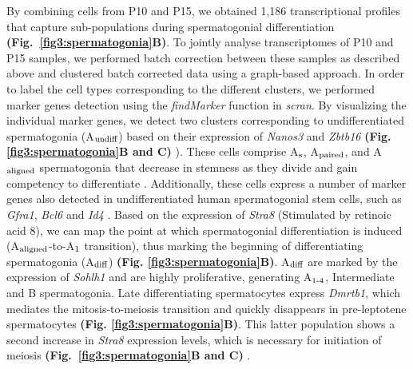 By combining cells from P10 and P15, we obtained 1,186 transcriptional profiles that capture sub-populations during spermatogonial differentiation \textbf{(Fig.~\ref{fig3:spermatogonia}B)}. To jointly analyse transcriptomes of P10 and P15 samples, we performed batch correction between these samples as described above and clustered batch corrected data using a graph-based approach. In order to label the cell types corresponding to the different clusters, we performed marker genes detection using the \emph{findMarker} function in \emph{scran}. By visualizing the individual marker genes, we detect two clusters corresponding to undifferentiated spermatogonia (A$_\textnormal{undiff}$) based on their expression of \textit{Nanos3} and \textit{Zbtb16} \textbf{(Fig. \ref{fig3:spermatogonia}B and C)} \citep{Buaas2004, Lolicato2008}). These cells comprise A$_\textnormal{s}$, A$_\textnormal{paired}$, and A$_\textnormal{aligned}$ spermatogonia that decrease in stemness as they divide and gain competency to differentiate \citep{Suzuki2012}. Additionally, these cells express a number of marker genes also detected in undifferentiated human spermatogonial stem cells, such as \textit{Gfra1}, \textit{Bcl6} and \textit{Id4} \citep{Guo2017}. Based on the expression of \textit{Stra8} (Stimulated by retinoic acid 8), we can map the point at which spermatogonial differentiation is induced (A$_\textnormal{aligned}$-to-A$_\textnormal{1}$ transition), thus marking the beginning of differentiating spermatogonia (A$_\textnormal{diff}$) \citep{Endo2015} \textbf{(Fig. \ref{fig3:spermatogonia}B)}. A$_\textnormal{diff}$ are marked by the expression of \textit{Sohlh1} \citep{Ballow2006} and are highly proliferative, generating A$_\textnormal{1-4}$, Intermediate and B spermatogonia. Late differentiating spermatocytes express \textit{Dmrtb1}, which mediates the mitosis-to-meiosis transition and quickly disappears in pre-leptotene spermatocytes \textbf{(Fig. \ref{fig3:spermatogonia}B)}. This latter population shows a second increase in \textit{Stra8} expression levels, which is necessary for initiation of meiosis \textbf{(Fig.~\ref{fig3:spermatogonia}B and C)} \citep{Anderson2008, Endo2015, Zhang2014}. 

\newpage

